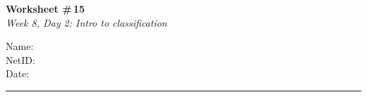 \documentclass[11pt]{article}
\begin{document}
\noindent
\begin{minipage}[t]{0.55\textwidth}
  \vspace{0pt}
  {\LARGE \textbf{Worksheet \#\,15}} \\[0.3em]
  {\large \textit{Week 8, Day 2: Intro to classification}}
\end{minipage}
\hfill
\begin{minipage}[t]{0.40\textwidth}
  \vspace{0pt}
  \begin{mdframed}[linecolor=black, linewidth=1pt, innertopmargin=10pt, innerbottommargin=10pt]
    \small
    \vspace{0.4cm}
    Name: \underline{\hspace{4.5cm}} \\[1em]
    NetID: \underline{\hspace{4.3cm}} \\[1em]
    Date: \underline{\hspace{4.4cm}} \\
  \end{mdframed}
\end{minipage}

\vspace{1em}
\noindent\rule{\linewidth}{1pt}
\vspace{0.2em}
\end{document}
